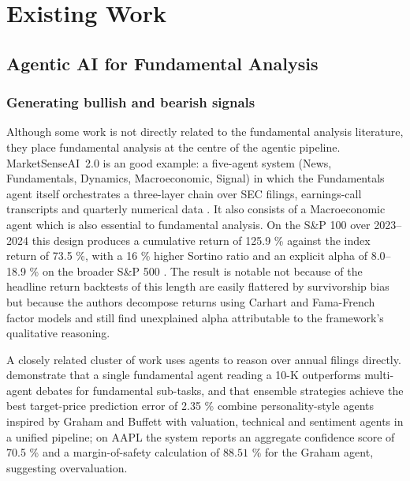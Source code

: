 \section{Existing Work}
\label{sec:thematicreview}

\subsection{Agentic AI for Fundamental Analysis}
\label{sec:fundamentalagents}

\subsubsection{Generating bullish and bearish signals}
\label{sec:signal-gen}

Although some work is not directly related to the fundamental analysis literature, they place fundamental analysis at the centre of the agentic pipeline. MarketSenseAI~2.0 is
an good example: a five-agent system (News, Fundamentals,
Dynamics, Macroeconomic, Signal) in which the Fundamentals agent
itself orchestrates a three-layer chain over SEC filings,
earnings-call transcripts and quarterly numerical data
\citep{Fatouros2025MarketSense}. It also consists of a Macroeconomic agent which is also essential to fundamental analysis. On the S\&P 100 over 2023--2024 this design
produces a cumulative return of 125.9 \% against the index
return of 73.5 \%, with a 16 \% higher Sortino ratio and
an explicit alpha of 8.0--18.9 \% on the broader S\&P 500
\citep{Fatouros2025MarketSense}. The result is notable not because of the
headline return backtests of this length are easily flattered by
survivorship bias but because the authors decompose returns
using Carhart and Fama-French factor models and still find
unexplained alpha attributable to the framework's qualitative
reasoning.

A closely related cluster of work uses agents to reason over annual
filings directly. \citet{han2024} demonstrate that a single
fundamental agent reading a 10-K outperforms multi-agent debates for
fundamental sub-tasks, and that ensemble strategies achieve the best
target-price prediction error of 2.35 \%
\citet{mattaparty2025} combine personality-style agents inspired by
Graham and Buffett with valuation, technical and sentiment agents in
a unified pipeline; on AAPL the system reports an aggregate
confidence score of 70.5 \% and a margin-of-safety calculation
of $88.51$ \% for the Graham agent, suggesting overvaluation.

